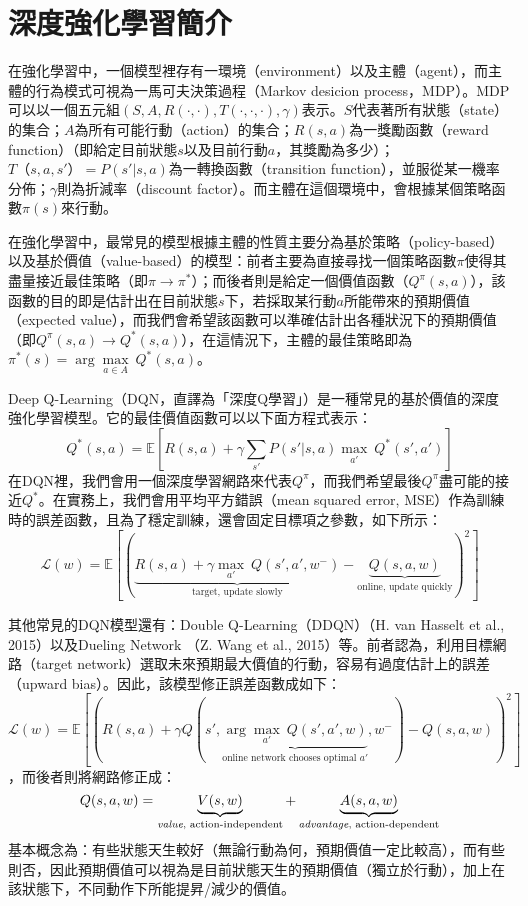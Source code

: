 \documentclass{article}
\begin{document}
\section{深度強化學習簡介}
在強化學習中，一個模型裡存有一環境（environment）以及主體（agent），而主體的行為模式可視為一馬可夫決策過程（Markov desicion process，MDP）。MDP可以以一個五元組$(S,A,R(\cdot,\cdot),T(\cdot, \cdot, \cdot),\gamma)$表示。$S$代表著所有狀態（state）的集合；$A$為所有可能行動（action）的集合；$R(s,a)$為一獎勵函數（reward function）（即給定目前狀態$s$以及目前行動$a$，其獎勵為多少）；$T（s,a,s'）=P(s'|s,a)$為一轉換函數（transition function），並服從某一機率分佈；$\gamma$則為折減率（discount factor）。而主體在這個環境中，會根據某個策略函數$\pi(s)$來行動。\par
在強化學習中，最常見的模型根據主體的性質主要分為基於策略（policy-based）以及基於價值（value-based）的模型：前者主要為直接尋找一個策略函數$\pi$使得其盡量接近最佳策略（即$\pi \rightarrow \pi^*$）；而後者則是給定一個價值函數（$Q^\pi (s,a)$），該函數的目的即是估計出在目前狀態$s$下，若採取某行動$a$所能帶來的預期價值（expected value），而我們會希望該函數可以準確估計出各種狀況下的預期價值（即$Q^\pi (s,a) \rightarrow Q^* (s,a)$），在這情況下，主體的最佳策略即為$\pi^*(s) = \arg \underset{a \in A}\max\ Q^*(s,a)$。\par
Deep Q-Learning（DQN，直譯為「深度Q學習」）是一種常見的基於價值的深度強化學習模型。它的最佳價值函數可以以下面方程式表示：
\[Q^*(s,a) = \mathbb{E}\left[R(s,a) + \gamma \sum_{s'}P(s'|s,a) \underset{a'}\max\ Q^*(s',a')\right]\]
在DQN裡，我們會用一個深度學習網路來代表$Q^\pi$，而我們希望最後$Q^\pi$盡可能的接近$Q^*$。在實務上，我們會用平均平方錯誤（mean squared error, MSE）作為訓練時的誤差函數，且為了穩定訓練，還會固定目標項之參數，如下所示：
\[\mathcal{L}(w) = \mathbb{E}\left[\left(\underbrace{R(s,a) + \gamma \underset{a'}\max\ Q(s',a', w^-)}_{\text{target, update slowly}} - \underbrace{Q(s,a,w)}_{\text{online, update quickly}}\right)^2\right]\]
\par
其他常見的DQN模型還有：Double Q-Learning（DDQN）（H. van Hasselt et al., 2015）\cite{DBLP:journals/corr/HasseltGS15}以及Dueling Network （Z. Wang et al., 2015）\cite{DBLP:journals/corr/WangFL15}等。前者認為，利用目標網路（target network）選取未來預期最大價值的行動，容易有過度估計上的誤差（upward bias）。因此，該模型修正誤差函數成如下：
\[\mathcal{L}(w) = \mathbb{E}\left[\left(R(s,a) + \gamma Q(s',\underbrace{\arg \underset{a'}\max\ Q(s',a',w)}_{\text{online network chooses optimal } a'}, w^-) - Q(s,a,w)\right)^2\right]\]，而後者則將網路修正成：
\[Q(s,a,w) = \underbrace{V(s,w)}_{\text{\emph{value}, action-independent}} + \underbrace{A(s,a,w)}_{\text{\emph{advantage}, action-dependent}}\]
基本概念為：有些狀態天生較好（無論行動為何，預期價值一定比較高），而有些則否，因此預期價值可以視為是目前狀態天生的預期價值（獨立於行動），加上在該狀態下，不同動作下所能提昇/減少的價值。
\end{document}

